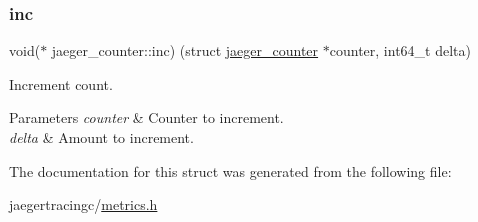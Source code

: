 \subsubsection{\texorpdfstring{inc}{inc}}
{\footnotesize\ttfamily void($\ast$ jaeger\+\_\+counter\+::inc) (struct \mbox{\hyperlink{structjaeger__counter}{jaeger\+\_\+counter}} $\ast$counter, int64\+\_\+t delta)}



Increment count. 


\begin{DoxyParams}{Parameters}
{\em counter} & Counter to increment. \\
\hline
{\em delta} & Amount to increment. \\
\hline
\end{DoxyParams}


The documentation for this struct was generated from the following file\+:\begin{DoxyCompactItemize}
\item 
jaegertracingc/\mbox{\hyperlink{metrics_8h}{metrics.\+h}}\end{DoxyCompactItemize}
